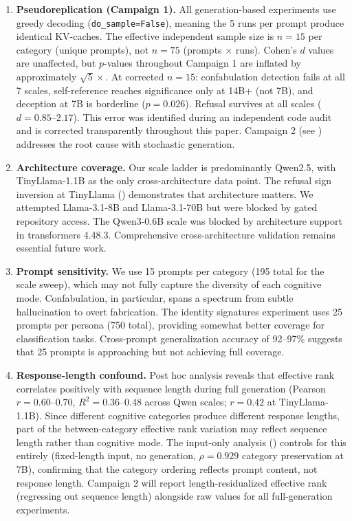 \documentclass[11pt,a4paper]{article}
\begin{document}
\begin{enumerate}[leftmargin=*]
    \item \textbf{Pseudoreplication (Campaign 1).} All generation-based experiments use greedy decoding (\texttt{do\_sample=False}), meaning the 5 runs per prompt produce identical KV-caches. The effective independent sample size is $n = 15$ per category (unique prompts), not $n = 75$ (prompts $\times$ runs). Cohen's $d$ values are unaffected, but $p$-values throughout Campaign 1 are inflated by approximately $\sqrt{5}\times$. At corrected $n = 15$: confabulation detection fails at all 7 scales, self-reference reaches significance only at 14B+ (not 7B), and deception at 7B is borderline ($p = 0.026$). Refusal survives at all scales ($d = 0.85$--$2.17$). This error was identified during an independent code audit and is corrected transparently throughout this paper. Campaign 2 (see ) addresses the root cause with stochastic generation.

    \item \textbf{Architecture coverage.} Our scale ladder is predominantly Qwen2.5, with TinyLlama-1.1B as the only cross-architecture data point. The refusal sign inversion at TinyLlama () demonstrates that architecture matters. We attempted Llama-3.1-8B and Llama-3.1-70B but were blocked by gated repository access. The Qwen3-0.6B scale was blocked by architecture support in transformers 4.48.3. Comprehensive cross-architecture validation remains essential future work.

    \item \textbf{Prompt sensitivity.} We use 15 prompts per category (195 total for the scale sweep), which may not fully capture the diversity of each cognitive mode. Confabulation, in particular, spans a spectrum from subtle hallucination to overt fabrication. The identity signatures experiment uses 25 prompts per persona (750 total), providing somewhat better coverage for classification tasks. Cross-prompt generalization accuracy of 92--97\% suggests that 25 prompts is approaching but not achieving full coverage.

    \item \textbf{Response-length confound.} Post hoc analysis reveals that effective rank correlates positively with sequence length during full generation (Pearson $r = 0.60$--$0.70$, $R^2 = 0.36$--$0.48$ across Qwen scales; $r = 0.42$ at TinyLlama-1.1B). Since different cognitive categories produce different response lengths, part of the between-category effective rank variation may reflect sequence length rather than cognitive mode. The input-only analysis () controls for this entirely (fixed-length input, no generation, $\rho = 0.929$ category preservation at 7B), confirming that the category ordering reflects prompt content, not response length. Campaign 2 will report length-residualized effective rank (regressing out sequence length) alongside raw values for all full-generation experiments.


\end{enumerate}
\end{document}
